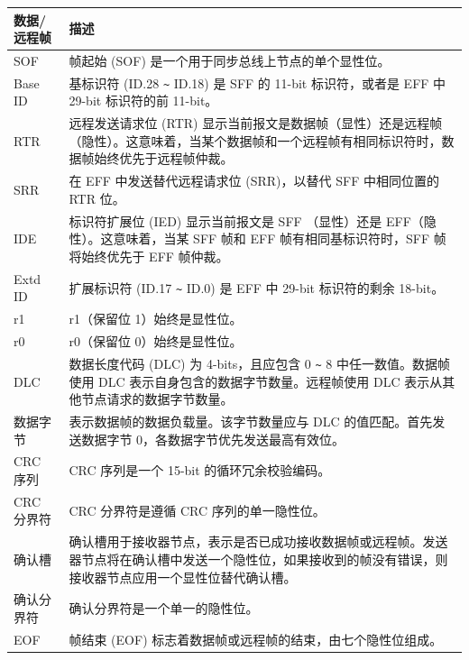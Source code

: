 \documentclass[main\_\_CN.tex]{subfiles}
\begin{document}
\begin{longtable}[c]{|p{3.5cm}|p{12cm}|}
  \hline
  \rowcolor{lightgray}
   {数据/远程帧} & {描述}
   \\\hline
  \endhead
  \endfoot
  \hline
  \endlastfoot
    SOF & 帧起始 (SOF) 是一个用于同步总线上节点的单个显性位。
          \\\hline
    Base ID & 基标识符 (ID.28 \verb+~+ ID.18) 是 SFF 的 11-bit 标识符，或者是 EFF 中 29-bit 标识符的前 11-bit。
          \\\hline
    RTR & 远程发送请求位 (RTR) 显示当前报文是数据帧（显性）还是远程帧（隐性）。这意味着，当某个数据帧和一个远程帧有相同标识符时，数据帧始终优先于远程帧仲裁。                                                    \\\hline
    SRR & 在 EFF 中发送替代远程请求位 (SRR)，以替代 SFF 中相同位置的 RTR 位。
           \\\hline
    IDE & 标识符扩展位 (IED) 显示当前报文是 SFF （显性）还是 EFF（隐性）。这意味着，当某 SFF 帧和 EFF 帧有相同基标识符时，SFF 帧将始终优先于 EFF 帧仲裁。              \\\hline
    Extd ID & 扩展标识符 (ID.17 \verb+~+ ID.0) 是 EFF 中 29-bit 标识符的剩余 18-bit。                                     \\\hline
    r1 & r1（保留位 1）始终是显性位。
             \\\hline
    r0 & r0（保留位 0）始终是显性位。
             \\\hline
    DLC & 数据长度代码 (DLC) 为 4-bits，且应包含 0 \verb+~+ 8 中任一数值。数据帧使用 DLC 表示自身包含的数据字节数量。远程帧使用 DLC 表示从其他节点请求的数据字节数量。
             \\\hline
    数据字节 & 表示数据帧的数据负载量。该字节数量应与 DLC 的值匹配。首先发送数据字节 0，各数据字节优先发送最高有效位。
             \\\hline
    CRC 序列 & CRC 序列是一个 15-bit 的循环冗余校验编码。
             \\\hline
    CRC 分界符 & CRC 分界符是遵循 CRC 序列的单一隐性位。
              \\\hline
    确认槽 & 确认槽用于接收器节点，表示是否已成功接收数据帧或远程帧。发送器节点将在确认槽中发送一个隐性位，如果接收到的帧没有错误，则接收器节点应用一个显性位替代确认槽。
              \\\hline
    确认分界符 & 确认分界符是一个单一的隐性位。
              \\\hline
    EOF & 帧结束 (EOF) 标志着数据帧或远程帧的结束，由七个隐性位组成。
              \\\hline
\end{longtable}
\end{document}
